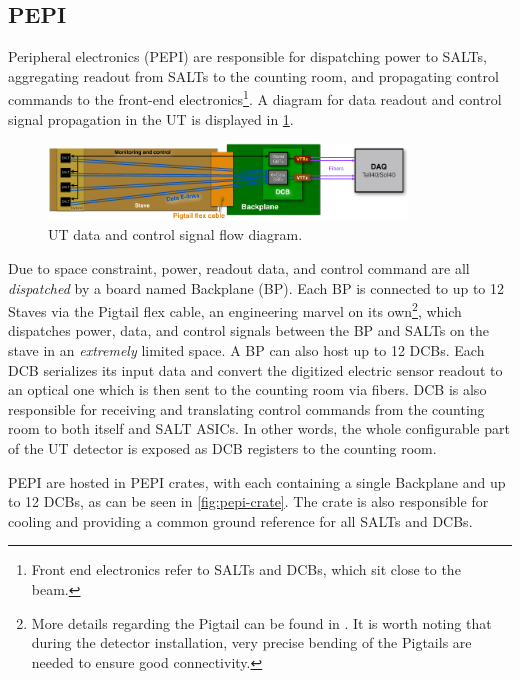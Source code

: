 \subsection{PEPI}
\label{ref:ut:overview:pepi}

Peripheral electronics (PEPI) are responsible for dispatching power to SALTs,
aggregating readout from SALTs to the counting room,
and propagating control commands to the front-end electronics\footnote{
    Front end electronics refer to SALTs and DCBs, which sit close to the beam.
}.
A diagram for data readout and control signal propagation in the UT is displayed
in
\cref{fig:ut-readout-diagram}.

\begin{figure}[!htb]
    \centering
    \includegraphics[width=0.85\textwidth]{./figs-ut-upgrade/detector/ut_data_control_flow.pdf}
    \caption{
        UT data and control signal flow diagram.
    }
    \label{fig:ut-readout-diagram}
\end{figure}

Due to space constraint, power, readout data, and control command
are all \emph{dispatched} by a board named Backplane (BP).
Each BP is connected to up to 12 Staves via the Pigtail flex cable,
an engineering marvel on its own\footnote{
    More details regarding the Pigtail can be found in
    \cite{Andrews:2018vla}.
    It is worth noting that during the detector installation,
    very precise bending of the Pigtails are needed to ensure good connectivity.
},
which dispatches power, data, and control signals between the BP and SALTs on
the stave in an \emph{extremely} limited space.
A BP can also host up to 12 DCBs.
Each DCB serializes its input data and convert the digitized electric sensor
readout to an optical one which is then sent to the counting room via fibers.
DCB is also responsible for receiving and translating control commands from the
counting room to both itself and SALT ASICs.
In other words, the whole configurable part of the UT detector is exposed as DCB
registers to the counting room.

PEPI are hosted in PEPI crates, with each containing a single Backplane and up
to 12 DCBs,
as can be seen in \cref{fig:pepi-crate}.
The crate is also responsible for cooling and providing a common ground
reference for all SALTs and DCBs.

